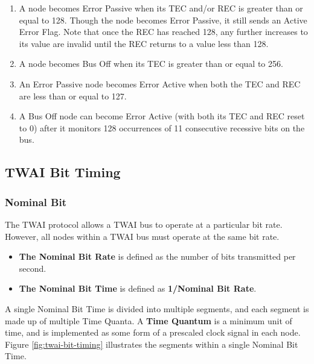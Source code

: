 \documentclass[main\_\_EN.tex]{subfiles}
\begin{document}
\begin{enumerate}
\begin{itemize}
        \item If the REC is between 1 and 127, it will be decremented by 1.
        \item If the REC is greater than 127, it will be set to 127.
        \item If the REC is 0, it will remain 0.
    \end{itemize}
    \item A node becomes Error Passive when its TEC and/or REC is greater than or equal to 128. Though the node becomes Error Passive, it still sends an Active Error Flag. Note that once the REC has reached 128, any further increases to its value are invalid until the REC returns to a value less than 128.
    \item A node becomes Bus Off when its TEC is greater than or equal to 256.
    \item An Error Passive node becomes Error Active when both the TEC and REC are less than or equal to 127.
    \item A Bus Off node can become Error Active (with both its TEC and REC reset to 0) after it monitors 128 occurrences of 11 consecutive recessive bits on the bus.
\end{enumerate}

\subsection{TWAI Bit Timing}
\subsubsection{Nominal Bit}

The TWAI protocol allows a TWAI bus to operate at a particular bit rate. However, all nodes within a TWAI bus must operate at the same bit rate.

\begin{itemize}
    \item \textbf{The Nominal Bit Rate} is defined as the number of bits transmitted per second.
    \item \textbf{The Nominal Bit Time} is defined as \textbf{1/Nominal Bit Rate}.
\end{itemize}

A single Nominal Bit Time is divided into multiple segments, and each segment is made up of multiple Time Quanta. A \textbf{Time Quantum} is a minimum unit of time, and is implemented as some form of a prescaled clock signal in each node. Figure \ref{fig:twai-bit-timing} illustrates the segments within a single Nominal Bit Time.
\end{document}
